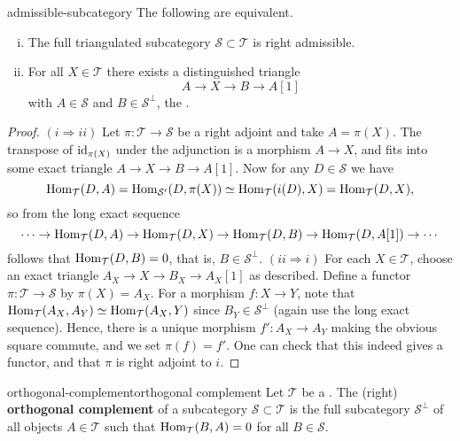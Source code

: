 \begin{example}{admissible-subcategory}
    The following are equivalent.
    \begin{enumerate}[(i)]
        \item The full triangulated subcategory $\mathcal{S} \subset \mathcal{T}$ is right admissible.
        \item For all $X \in \mathcal{T}$ there exists a distinguished triangle
        \[ A \to X \to B \to A[1] \]
        with $A \in \mathcal{S}$ and $B \in {\mathcal{S}}^\perp$, the .
    \end{enumerate}
    \begin{proof}
        $(i \Rightarrow ii)$ Let $\pi : \mathcal{T} \to \mathcal{S}$ be a right adjoint and take $A = \pi(X)$. The transpose of $\text{id}_{\pi(X)}$ under the adjunction is a morphism $A \to X$, and fits into some exact triangle $A \to X \to B \to A[1]$. Now for any $D \in \mathcal{S}$ we have
        \[ \text{Hom}_\mathcal{T}(D, A) = \text{Hom}_{\mathcal{S}'}(D, \pi(X)) \simeq \text{Hom}_\mathcal{T}(i(D), X) = \text{Hom}_\mathcal{T}(D, X) , \]
        so from the long exact sequence
        \[ \cdots \to \text{Hom}_\mathcal{T}(D, A) \to \text{Hom}_\mathcal{T}(D, X) \to \text{Hom}_\mathcal{T}(D, B) \to \text{Hom}_\mathcal{T}(D, A[1]) \to \cdots \]
        follows that $\text{Hom}_\mathcal{T}(D, B) = 0$, that is, $B \in \mathcal{S}^\perp$.
        $(ii \Rightarrow i)$ For each $X \in \mathcal{T}$, choose an exact triangle $A_X \to X \to B_X \to A_X[1]$ as described. Define a functor $\pi : \mathcal{T} \to \mathcal{S}$ by $\pi(X) = A_X$. For a morphism $f : X \to Y$, note that $\text{Hom}_\mathcal{T}(A_X, A_Y) \simeq \text{Hom}_\mathcal{T}(A_X, Y)$ since $B_Y \in \mathcal{S}^\perp$ (again use the long exact sequence). Hence, there is a unique morphism $f' : A_X \to A_Y$ making the obvious square commute, and we set $\pi(f) = f'$. One can check that this indeed gives a functor, and that $\pi$ is right adjoint to $i$.
    \end{proof}
\end{example}

\begin{topic}{orthogonal-complement}{orthogonal complement}
    Let $\mathcal{T}$ be a . The (right) \textbf{orthogonal complement} of a subcategory $\mathcal{S} \subset \mathcal{T}$ is the full subcategory $\mathcal{S}^\perp$ of all objects $A \in \mathcal{T}$ such that $\text{Hom}_\mathcal{T}(B, A) = 0$ for all $B \in \mathcal{S}$.
\end{topic}

